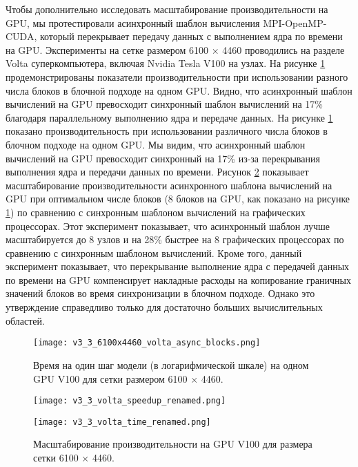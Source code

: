 Чтобы дополнительно исследовать масштабирование производительности на GPU, мы протестировали асинхронный шаблон вычисления MPI-OpenMP-CUDA, который перекрывает передачу данных с выполнением ядра по времени на GPU. Эксперименты на сетке размером 6100 × 4460 проводились на разделе Volta суперкомпьютера, включая Nvidia Tesla V100 на узлах.
На рисунке \ref{fig:asyncGPU_onenode} продемонстрированы показатели производительности при использовании разного числа блоков в блочной подходе на одном GPU. Видно, что асинхронный шаблон вычислений на GPU превосходит синхронный шаблон вычислений на 17\% благодаря параллельному выполнению ядра и передаче данных.
На рисунке \ref{fig:asyncGPU_onenode} показано производительность при использовании различного числа блоков в блочном подходе на одном GPU. Мы видим, что асинхронный шаблон вычислений на GPU превосходит синхронный на 17\% из-за перекрывания выполнения ядра и передачи данных по времени.
Рисунок \ref{fig:asyncGPU} показывает масштабирование производительности асинхронного шаблона вычислений на GPU при оптимальном числе блоков (8 блоков на GPU, как показано на рисунке \ref{fig:asyncGPU_onenode}) по сравнению с синхронным шаблоном вычислений на графических процессорах.
Этот эксперимент показывает, что асинхронный шаблон лучше масштабируется до 8 узлов и на 28\% быстрее на 8 графических процессорах по сравнению с синхронным шаблоном вычислений.
Кроме того, данный эксперимент показывает, что перекрывание выполнение ядра с передачей данных по времени на GPU компенсирует накладные расходы на копирование граничных значений блоков во время синхронизации в блочном подходе.
Однако это утверждение справедливо только для достаточно больших вычислительных областей.

\begin{figure}[!ht]
	\begin{minipage}{1\linewidth}
	\centering
	\texttt{[image: v3\_3\_6100x4460\_volta\_async\_blocks.png]}
	\end{minipage}
	\vspace{3pt}
	\caption{Время на один шаг модели (в логарифмической шкале) на одном GPU V100 для сетки размером 6100 $\times$ 4460.}
	\label{fig:asyncGPU_onenode}
\end{figure}

\begin{figure}[!ht]
	\begin{minipage}{0.5\linewidth}
	\centering
	\texttt{[image: v3\_3\_volta\_speedup\_renamed.png]}
	\end{minipage}
	\begin{minipage}{0.5\linewidth}
	\centering
	\texttt{[image: v3\_3\_volta\_time\_renamed.png]}
	\end{minipage}
	\vspace{3pt}
	\caption{Масштабирование производительности на GPU V100 для размера сетки 6100 $\times$ 4460.}
	\label{fig:asyncGPU}
\end{figure}

